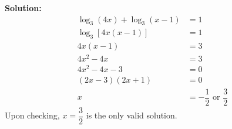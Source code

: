 \documentclass{report}
\newcommand{\sol}{\vspace{0.2cm}\textbf{Solution:}\vspace{0.2cm}}
\begin{document}
\begin{multicols*}{2}
\begin{enumerate}[leftmargin=*]
\begin{enumerate}
                        \sol{}
                        \begin{align*}
                            \log_3 (4x) + \log_3 (x - 1) & = 1                                      \\
                            \log_3 [4x(x - 1)]           & = 1                                      \\
                            4x(x - 1)                    & = 3                                      \\
                            4x^2 - 4x                    & = 3                                      \\
                            4x^2 - 4x - 3                & = 0                                      \\
                            (2x - 3)(2x + 1)             & = 0                                      \\
                            x                            & = -\dfrac{1}{2} \text{ or } \dfrac{3}{2}
                        \end{align*}
                        Upon checking, $x = \dfrac{3}{2}$ is the only valid solution.
              \end{enumerate}
    \end{enumerate}

\end{multicols*}
\end{document}
